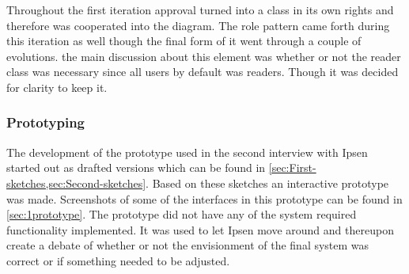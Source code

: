 Throughout the first iteration approval turned into a class in its own rights and therefore was cooperated into the diagram.
The role pattern came forth during this iteration as well though the final form of it went through a couple of evolutions.
the main discussion about this element was whether or not the reader class was necessary since all users by default was readers. 
Though it was decided for clarity to keep it.

\subsubsection*{Prototyping}
The development of the prototype used in the second interview with Ipsen started out as drafted versions which can be found in \cref{sec:First-sketches,sec:Second-sketches}.
Based on these sketches an interactive prototype was made. 
Screenshots of some of the interfaces in this prototype can be found in \cref{sec:1prototype}.
The prototype did not have any of the system required functionality implemented.
It was used to let Ipsen move around and thereupon create a debate of whether or not the envisionment of the final system was correct or if something needed to be adjusted.


